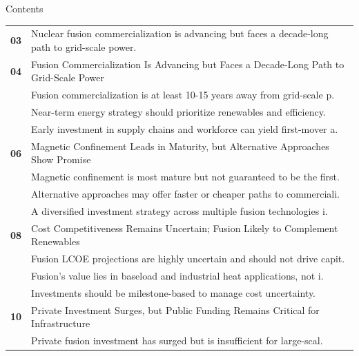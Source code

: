 \documentclass[10pt,a4paper]{article}
\begin{document}
\clearpage
{\sffamily\fontsize{26}{31}\selectfont\color{BONavy} Contents}\par\vspace{10pt}
\begin{tabularx}{\linewidth}{p{14mm}Y}
\textcolor{BOGreen}{\bfseries 03} & Nuclear fusion commercialization is advancing but faces a decade-long path to grid-scale power. \\[7pt]
\textcolor{BOGreen}{\bfseries 04} & Fusion Commercialization Is Advancing but Faces a Decade-Long Path to Grid-Scale Power \\[5pt]
 & {\scriptsize\color{BOMuted} Fusion commercialization is at least 10-15 years away from grid-scale p.} \\[1pt]
 & {\scriptsize\color{BOMuted} Near-term energy strategy should prioritize renewables and efficiency.} \\[1pt]
 & {\scriptsize\color{BOMuted} Early investment in supply chains and workforce can yield first-mover a.} \\[1pt]
\textcolor{BOGreen}{\bfseries 06} & Magnetic Confinement Leads in Maturity, but Alternative Approaches Show Promise \\[5pt]
 & {\scriptsize\color{BOMuted} Magnetic confinement is most mature but not guaranteed to be the first.} \\[1pt]
 & {\scriptsize\color{BOMuted} Alternative approaches may offer faster or cheaper paths to commerciali.} \\[1pt]
 & {\scriptsize\color{BOMuted} A diversified investment strategy across multiple fusion technologies i.} \\[1pt]
\textcolor{BOGreen}{\bfseries 08} & Cost Competitiveness Remains Uncertain; Fusion Likely to Complement Renewables \\[5pt]
 & {\scriptsize\color{BOMuted} Fusion LCOE projections are highly uncertain and should not drive capit.} \\[1pt]
 & {\scriptsize\color{BOMuted} Fusion's value lies in baseload and industrial heat applications, not i.} \\[1pt]
 & {\scriptsize\color{BOMuted} Investments should be milestone-based to manage cost uncertainty.} \\[1pt]
\textcolor{BOGreen}{\bfseries 10} & Private Investment Surges, but Public Funding Remains Critical for Infrastructure \\[5pt]
 & {\scriptsize\color{BOMuted} Private fusion investment has surged but is insufficient for large-scal.} \\[1pt]

\end{tabularx}
\end{document}
